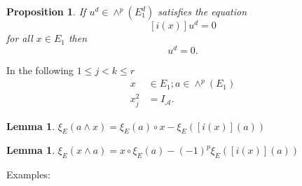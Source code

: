 \documentclass[aps,preprint]{revtex4}%
\newtheorem{lemma}[theorem]{Lemma}
\newtheorem{proposition}[theorem]{Proposition}
\begin{document}
\begin{proposition}
If $u^{d}\in\wedge^{p}\left(  E_{1}^{d}\right)  $ satisfies the equation
\begin{equation}
\left[  i\left(  x\right)  \right]  u^{d}=0
\end{equation}
for all $x\in E_{1}$ then
\begin{equation}
u^{d}=0.
\end{equation}

\end{proposition}

In the following $1\leq j<k\leq r$
\begin{align}
x  &  \in E_{1};a\in\wedge^{p}\left(  E_{1}\right) \\
x_{j}^{2}  &  =I_{\mathcal{A}}.
\end{align}


\begin{lemma}
$\xi_{E}\left(  a\wedge x\right)  =\xi_{E}\left(  a\right)  \circ x-\xi
_{E}\left(  \left[  i\left(  x\right)  \right]  \left(  a\right)  \right)  $
\end{lemma}

\begin{lemma}
$\xi_{E}\left(  x\wedge a\right)  =x\circ\xi_{E}\left(  a\right)  -\left(
-1\right)  ^{p}\xi_{E}\left(  \left[  i\left(  x\right)  \right]  \left(
a\right)  \right)  $
\end{lemma}

Examples:
\end{document}
